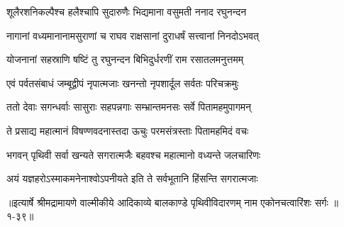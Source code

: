 \twolineshloka
{शूलैरशनिकल्पैश्च हलैश्चापि सुदारुणैः}
{भिद्यमाना वसुमती ननाद रघुनन्दन} %

\twolineshloka
{नागानां वध्यमानानामसुराणां च राघव}
{राक्षसानां दुराधर्षं सत्त्वानां निनदोऽभवत्} %

\twolineshloka
{योजनानां सहस्राणि षष्टिं तु रघुनन्दन}
{बिभिदुर्धरणीं राम रसातलमनुत्तमम्} %

\twolineshloka
{एवं पर्वतसंबाधं जम्बूद्वीपं नृपात्मजाः}
{खनन्तो नृपशार्दूल सर्वतः परिचक्रमुः} %

\twolineshloka
{ततो देवाः सगन्धर्वाः सासुराः सहपन्नगाः}
{सम्भ्रान्तमनसः सर्वे पितामहमुपागमन्} %

\twolineshloka
{ते प्रसाद्य महात्मानं विषण्णवदनास्तदा}
{ऊचुः परमसंत्रस्ताः पितामहमिदं वचः} %

\twolineshloka
{भगवन् पृथिवी सर्वा खन्यते सगरात्मजैः}
{बहवश्च महात्मानो वध्यन्ते जलचारिणः} %

\twolineshloka
{अयं यज्ञहरोऽस्माकमनेनाश्वोऽपनीयते}
{इति ते सर्वभूतानि हिंसन्ति सगरात्मजाः} %


॥इत्यार्षे श्रीमद्रामायणे वाल्मीकीये आदिकाव्ये बालकाण्डे पृथिवीविदारणम् नाम एकोनचत्वारिंशः सर्गः ॥१-३९॥
